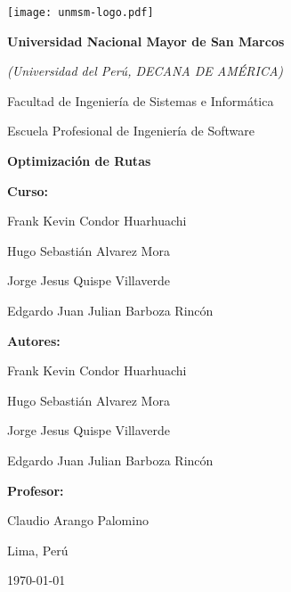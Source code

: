 \begin{titlepage}
    \centering %

    \texttt{[image: unmsm-logo.pdf]}\par %
    
    \vspace{1cm} %
    
    {\Large \textbf{Universidad Nacional Mayor de San Marcos}}\par
    {\large \textit{(Universidad del Perú, DECANA DE AMÉRICA)}}\par
    \vspace{0.5cm}
    {\large Facultad de Ingeniería de Sistemas e Informática}\par
    {\large Escuela Profesional de Ingeniería de Software}\par
    
    \vfill %
    \vspace{0.5cm}
    
    {\huge \bfseries Optimización de Rutas}\par

    \vfill %

    \begin{center}
    \large \textbf{Curso:}\par
    \normalsize Frank Kevin Condor Huarhuachi\par
    Hugo Sebastián Alvarez Mora\par
    Jorge Jesus Quispe Villaverde\par
    Edgardo Juan Julian Barboza Rincón\par
    \end{center}
    
    \begin{center}
    \large \textbf{Autores:}\par
    \normalsize Frank Kevin Condor Huarhuachi\par
    Hugo Sebastián Alvarez Mora\par
    Jorge Jesus Quispe Villaverde\par
    Edgardo Juan Julian Barboza Rincón\par
    \vspace{1cm}
    \large \textbf{Profesor:}\par
    \normalsize Claudio Arango Palomino\par
    \end{center}

    \vfill
    
    {\large Lima, Perú}\par
    {\large \today}\par %
    
\end{titlepage}